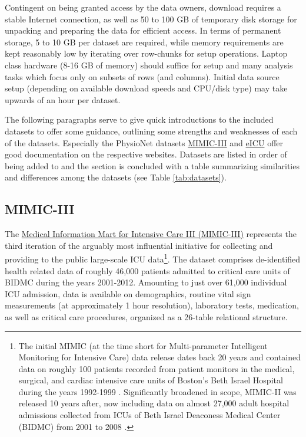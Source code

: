 \documentclass[
  notitle]{jss}
\begin{document}
Contingent on being granted access by the data owners, download requires
a stable Internet connection, as well as 50 to 100 GB of temporary disk
storage for unpacking and preparing the data for efficient access. In
terms of permanent storage, 5 to 10 GB per dataset are required, while
memory requirements are kept reasonably low by iterating over row-chunks
for setup operations. Laptop class hardware (8-16 GB of memory) should
suffice for setup and many analysis tasks which focus only on subsets of
rows (and columns). Initial data source setup (depending on available
download speeds and CPU/disk type) may take upwards of an hour per
dataset.

The following paragraphs serve to give quick introductions to the
included datasets to offer some guidance, outlining some strengths and
weaknesses of each of the datasets. Especially the PhysioNet datasets
\href{https://mimic.physionet.org/about/mimic/}{MIMIC-III} and
\href{https://eicu-crd.mit.edu/about/eicu/}{eICU} offer good
documentation on the respective websites. Datasets are listed in order
of being added to  and the section is concluded with a table
summarizing similarities and differences among the datasets (see Table
\ref{tab:datasets}).

\hypertarget{mimic-iii}{%
\subsection{MIMIC-III}\label{mimic-iii}}

The \href{https://physionet.org/content/mimiciii/1.4/}{Medical
Information Mart for Intensive Care III (MIMIC-III)} represents the
third iteration of the arguably most influential initiative for
collecting and providing to the public large-scale ICU data\footnote{The
  initial MIMIC (at the time short for Multi-parameter Intelligent
  Monitoring for Intensive Care) data release dates back 20 years and
  contained data on roughly 100 patients recorded from patient monitors
  in the medical, surgical, and cardiac intensive care units of Boston's
  Beth Israel Hospital during the years 1992-1999 \citep{moody1996}.
  Significantly broadened in scope, MIMIC-II was released 10 years
  after, now including data on almost 27,000 adult hospital admissions
  collected from ICUs of Beth Israel Deaconess Medical Center (BIDMC)
  from 2001 to 2008 \citep{lee2011}.}. The dataset comprises
de-identified health related data of roughly 46,000 patients admitted to
critical care units of BIDMC during the years 2001-2012. Amounting to
just over 61,000 individual ICU admission, data is available on
demographics, routine vital sign measurements (at approximately 1 hour
resolution), laboratory tests, medication, as well as critical care
procedures, organized as a 26-table relational structure.
\end{document}
